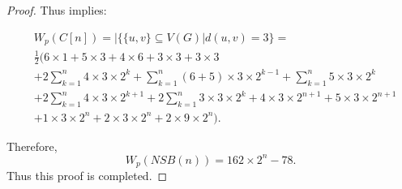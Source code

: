\documentclass[12pt]{article}
\theoremstyle{theorem}
\theoremstyle{defi}
\begin{document}
\begin{proof}
Thus implies:

\begin{equation}
\begin{split}
&W_p(C[n]) = |\{\{u,v\}\subseteq V(G)| d(u,v)=3\} = \\
& \frac{1}{2}(6\times 1 + 5\times 3 + 4\times 6 + 3\times 3 + 3\times 3 \\
&+ 2\sum_{k=1}^n 4\times 3\times 2^k + \sum_{k=1}^n (6+5)\times 3\times 2^{k-1} + \sum_{k=1}^n 5\times 3\times 2^{k} \\
&+ 2\sum_{k=1}^n 4\times 3\times 2^{k+1} + 2\sum_{k=1}^n 3\times 3\times 2^{k} + 4\times 3\times 2^{n+1} + 5\times 3\times 2^{n+1}\\
&+1\times 3\times 2^n + 2\times 3\times 2^n +2\times 9\times 2^n).
\end{split}
\end{equation}

Therefore, 
$$
W_p(NSB(n)) = 162\times 2^n - 78.
$$
Thus this proof is completed.
\end{proof}
\end{document}
